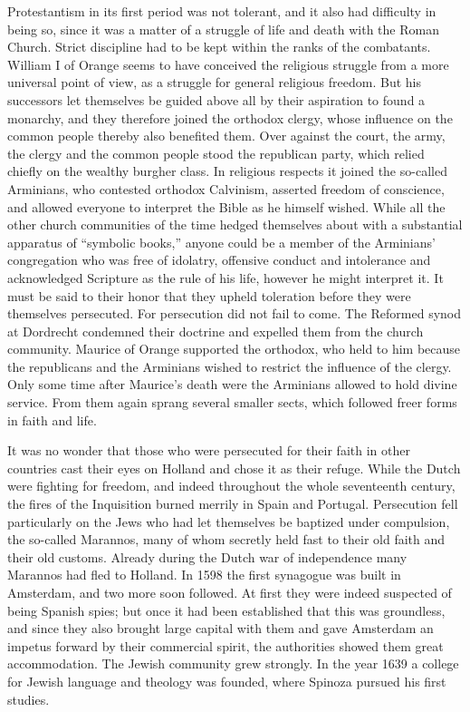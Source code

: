 \documentclass[12pt]{book}
\newcommand{\opage}[1]{\marginnote{\footnotesize\textit{[#1]}}}
\begin{document}
\opage{20}Protestantism in its first period was not tolerant, and it also had
difficulty in being so, since it was a matter of a struggle of life and death with
the Roman Church. Strict discipline had to be kept within the ranks of the
combatants. William I of Orange seems to have conceived the religious struggle from
a more universal point of view, as a struggle for general religious freedom. But his
successors let themselves be guided above all by their aspiration to found a
monarchy, and they therefore joined the orthodox clergy, whose influence on the
common people thereby also benefited them. Over against the court, the army, the
clergy and the common people stood the republican party, which relied chiefly on the
wealthy burgher class. In religious respects it joined the so-called Arminians, who
contested orthodox Calvinism, asserted freedom of conscience, and allowed everyone to
interpret the Bible as he himself wished. While all the other church communities of
the time hedged themselves about with a substantial apparatus of ``symbolic books,''
anyone could be a member of the Arminians' congregation who was free of idolatry,
offensive conduct and intolerance and acknowledged Scripture as the rule of his life,
however he might interpret it. It must be said to their honor that they upheld
toleration before they were themselves persecuted. For persecution did not fail to
come. The Reformed synod at Dordrecht condemned their doctrine and expelled them from
the church community. Maurice of Orange supported the orthodox, who held to him
because the republicans and the Arminians wished to restrict the influence of the
clergy. Only some time after Maurice's \opage{21}death were the Arminians allowed to
hold divine service. From them again sprang several smaller sects, which followed
freer forms in faith and life.

It was no wonder that those who were persecuted for their faith in other countries
cast their eyes on Holland and chose it as their refuge. While the Dutch were
fighting for freedom, and indeed throughout the whole seventeenth century, the fires
of the Inquisition burned merrily in Spain and Portugal. Persecution fell
particularly on the Jews who had let themselves be baptized under compulsion, the
so-called Marannos, many of whom secretly held fast to their old faith and their old
customs. Already during the Dutch war of independence many Marannos had fled to
Holland. In 1598 the first synagogue was built in Amsterdam, and two more soon
followed. At first they were indeed suspected of being Spanish spies; but once it
had been established that this was groundless, and since they also brought large
capital with them and gave Amsterdam an impetus forward by their commercial spirit,
the authorities showed them great accommodation. The Jewish community grew strongly.
In the year 1639 a college for Jewish language and theology was founded, where
Spinoza pursued his first studies.
\end{document}
